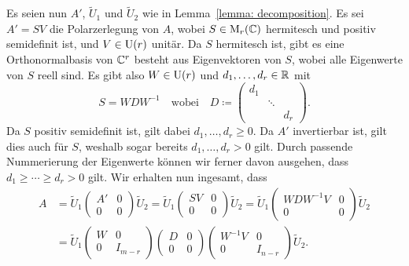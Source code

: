 Es seien nun $A'$, $\tilde{U}_1$ und $\tilde{U}_2$ wie in Lemma~\ref{lemma: decomposition}.
Es sei $A' = S V$ die Polarzerlegung von $A$, wobei $S \in \operatorname{M}_{r}(\mathbb{C})$ hermitesch und positiv semidefinit ist, und $V \in \operatorname{U}(r)$ unitär.
Da $S$ hermitesch ist, gibt es eine Orthonormalbasis von $\mathbb{C}^r$ besteht aus Eigenvektoren von $S$, wobei alle Eigenwerte von $S$ reell sind.
Es gibt also $W \in \operatorname{U}(r)$ und $d_1, \dotsc, d_r \in \mathbb{R}$ mit
\[
    S
  = W D W^{-1}
  \quad
  \text{wobei}
  \quad
              D
  \coloneqq   \begin{pmatrix}
                d_1 &         &     \\
                    & \ddots  &     \\
                    &         & d_r
              \end{pmatrix}.
\]
Da $S$ positiv semidefinit ist, gilt dabei $d_1, \dotsc, d_r \geq 0$.
Da $A'$ invertierbar ist, gilt dies auch für $S$, weshalb sogar bereits $d_1, \dotsc, d_r > 0$ gilt.
Durch passende Nummerierung der Eigenwerte können wir ferner davon ausgehen, dass $d_1 \geq \dotsb \geq d_r > 0$ gilt.
Wir erhalten nun ingesamt, dass
\begin{align*}
      A
  &=  \tilde{U}_1
      \begin{pmatrix}
        A'  & 0 \\
        0   & 0
      \end{pmatrix}
      \tilde{U}_2
    = \tilde{U}_1
      \begin{pmatrix}
        SV  & 0 \\
        0   & 0
      \end{pmatrix}
      \tilde{U}_2
    = \tilde{U}_1
      \begin{pmatrix}
        W D W^{-1} V  & 0 \\
        0             & 0
      \end{pmatrix}
      \tilde{U}_2
  \\
  &=  \tilde{U}_1
      \begin{pmatrix}
        W & 0       \\
        0 & I_{m-r}
      \end{pmatrix}
      \begin{pmatrix}
        D & 0 \\
        0 & 0
      \end{pmatrix}
      \begin{pmatrix}
        W^{-1} V  & 0       \\
        0         & I_{n-r}
      \end{pmatrix}
      \tilde{U}_2.
\end{align*}
